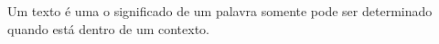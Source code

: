 Um texto é uma 
o significado de um palavra somente pode ser determinado quando está dentro de um contexto.















